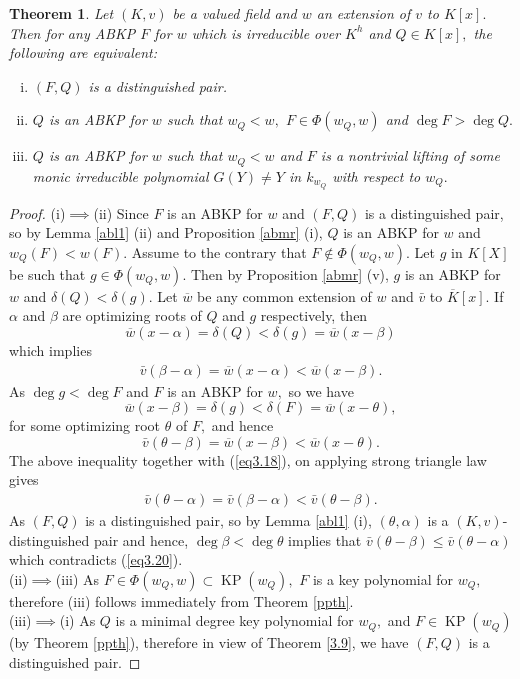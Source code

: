 \documentclass[11pt]{amsart}
\newtheorem{theorem}{Theorem}[section]
\theoremstyle{definition}
\theoremstyle{remark}
\numberwithin{equation}{section}
\begin{document}
	\begin{theorem}\label{abth}
		Let $(K,v)$ be a valued field and $w$ an extension of $v$ to $K[x].$ Then for any ABKP $F$ for $w$ which is irreducible over $K^h$ and $Q\in K[x],$ the following are equivalent:
		\begin{enumerate}[(i)] 
			\item  $(F,Q)$ is a distinguished pair.
			\item  $Q$ is an ABKP for $w$ such that  $w_Q<w,$ $F\in\Phi(w_Q,w)$  and  $\deg F>\deg Q.$
			\item   $Q$ is an ABKP for $w$ such that  $w_Q<w$ and  $F$ is a   nontrivial lifting of some monic irreducible polynomial $G(Y)\neq Y$ in $k_{w_Q}$ with respect to $w_Q.$   
		\end{enumerate}
	\end{theorem}
	\begin{proof}
		(i)$\implies$(ii)
		Since $F$ is an ABKP for $w$ and $(F,Q)$ is a distinguished pair, so by Lemma \ref{abl1} (ii) and  Proposition \ref{abmr} (i),  $Q$ is an ABKP for $w$ and   $w_Q(F)<w(F).$
		Assume  to the contrary that $F\notin \Phi(w_Q,w).$ Let  $g$ in $K[X]$ be such that $g\in\Phi(w_Q,w).$ Then by  Proposition \ref{abmr} (v),   $g$ is an ABKP for $w$ and $\delta(Q)<\delta(g).$  Let $\overline{w}$ be any common extension of $w$ and $\bar{v}$ to $\overline K[x].$ If $\alpha$ and $\beta$ are optimizing roots of $Q$ and $g$ respectively, then
		$$\overline{w}(x-\alpha)=\delta(Q)<\delta(g)=\overline{w}(x-\beta)$$ which implies
		\begin{align}\label{eq3.18}
			\bar{v}(\beta-\alpha)=\overline{w}(x-\alpha)<\overline{w}(x-\beta) .
		\end{align}
	As $\deg g<\deg F$ and $F$ is an ABKP for $w,$ so we have
		$$\overline{w}(x-\beta)=\delta(g)<\delta(F)=\overline{w}(x-\theta),$$
		for some optimizing root $\theta$   of $F,$  and hence 
		$$\bar{v}(\theta-\beta)=\overline{w}(x-\beta)<\overline{w}(x-\theta).$$
		The above inequality together with (\ref{eq3.18}), on applying strong triangle law gives
		\begin{align}\label{eq3.20}
			\bar{v}(\theta-\alpha)=\bar{v}(\beta-\alpha)<\bar{v}(\theta-\beta).
		\end{align}
		As $(F,Q)$ is a distinguished pair, so by Lemma \ref{abl1} (i),  $(\theta,\alpha)$  is a $(K,v)$-distinguished pair and hence, 
		$\deg\beta<\deg\theta$ implies that $\bar{v}(\theta-\beta)\leq\bar{v}(\theta-\alpha)$ which contradicts  (\ref{eq3.20}). \\
		(ii)$\implies$(iii) As $F\in\Phi(w_Q,w) \subset \operatorname{KP}(w_Q),$ $F$ is a key polynomial for $w_Q,$ therefore (iii) follows immediately from Theorem \ref{ppth}.\\
			(iii)$\implies$(i) As $Q$ is a minimal degree key polynomial for $w_Q,$ and $F\in\operatorname{KP}(w_Q)$ (by Theorem \ref{ppth}), therefore in view of Theorem \ref{3.9}, we have $(F,Q)$ is a distinguished pair.
		\end{proof}
	
\end{document}

